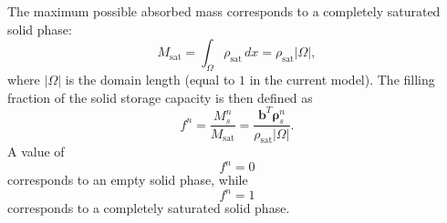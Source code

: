 The maximum possible absorbed mass corresponds to a completely saturated
solid phase:
\begin{equation}
M_{\mathrm{sat}}
=
\int_{\Omega}\rho_{\mathrm{sat}}\,dx
=
\rho_{\mathrm{sat}}|\Omega|,
\end{equation}
where $|\Omega|$ is the domain length (equal to $1$ in the current model).
The filling fraction of the solid storage capacity is then defined as
\begin{equation}
f^n
=
\frac{M_s^n}{M_{\mathrm{sat}}}
=
\frac{\mathbf{b}^T\boldsymbol{\rho}_s^n}
{\rho_{\mathrm{sat}}|\Omega|}.
\end{equation}
A value of
\begin{equation}
f^n=0
\end{equation}
corresponds to an empty solid phase, while
\begin{equation}
f^n=1
\end{equation}
corresponds to a completely saturated solid phase.

\newpage
